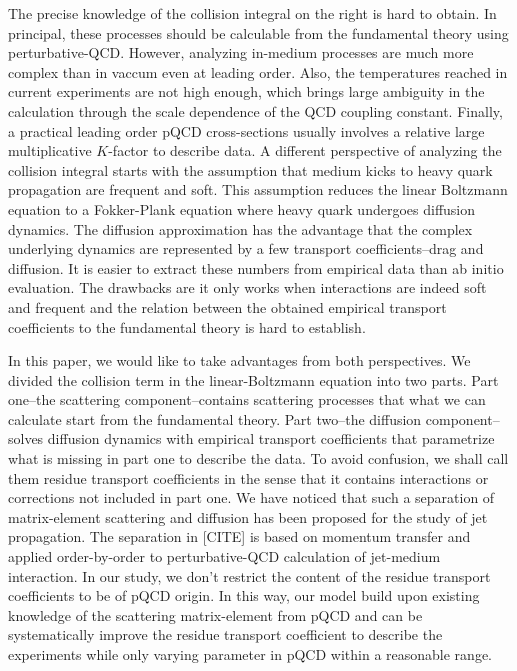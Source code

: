 \documentclass[aps, prc, reprint, amsmath, groupedaddress, nofootinbib]{revtex4-1}
\begin{document}
The precise knowledge of the collision integral on the right is hard to obtain.
In principal, these processes should be calculable from the fundamental theory using perturbative-QCD. 
However, analyzing in-medium processes are much more complex than in vaccum even at leading order. 
Also, the temperatures reached in current experiments are not high enough, which brings large ambiguity in the calculation through the scale dependence of the QCD coupling constant.
Finally, a practical leading order pQCD cross-sections usually involves a relative large multiplicative $K$-factor to describe data.
A different perspective of analyzing the collision integral starts with the assumption that medium kicks to heavy quark propagation are frequent and soft.
This assumption reduces the linear Boltzmann equation to a Fokker-Plank equation where heavy quark undergoes diffusion dynamics. 
The diffusion approximation has the advantage that the complex underlying dynamics are represented by a few transport coefficients--drag and diffusion. 
It is easier to extract these numbers from empirical data than ab initio evaluation. 
The drawbacks are it only works when interactions are indeed soft and frequent and the relation between the obtained empirical transport coefficients to the fundamental theory is hard to establish.

In this paper, we would like to take advantages from both perspectives.
We divided the collision term in the linear-Boltzmann equation into two parts.
Part one--the scattering component--contains scattering processes that what we can calculate start from the fundamental theory.
Part two--the diffusion component--solves diffusion dynamics with empirical transport coefficients that parametrize what is missing in part one to describe the data. 
To avoid confusion, we shall call them residue transport coefficients in the sense that it contains interactions or corrections not included in part one.
We have noticed that such a separation of matrix-element scattering and diffusion has been proposed for the study of jet propagation.
The separation in [CITE] is based on momentum transfer and applied order-by-order to perturbative-QCD calculation of jet-medium interaction.
In our study, we don't restrict the content of the residue transport coefficients to be of pQCD origin.
In this way, our model build upon existing knowledge of the scattering matrix-element from pQCD and can be systematically improve the residue transport coefficient to describe the experiments while only varying parameter in pQCD within a reasonable range.
\end{document}
